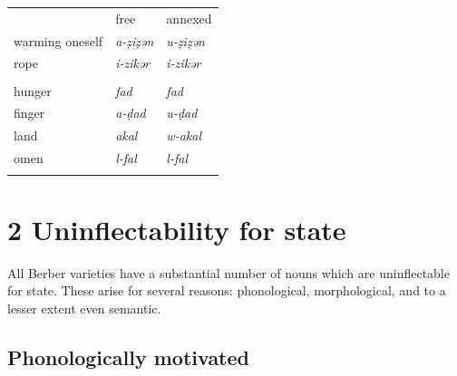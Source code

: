 \documentclass[output=paper]{langscibook}
\begin{document}
\begin{styleLangsciTableHeading}%
\begin{table}
\caption{Examples of allomorphy in state marking in Kabyle (cf. \citealt{Dallet1982})}
\label{tab:key:2}
\end{table}\end{styleLangsciTableHeading}


\begin{tabularx}{\textwidth}{XXX}
 & free & annexed\\
\lsptoprule
warming oneself & \textit{a-ẓiẓən} & \textit{u-ẓiẓən}\\
rope & \textit{i-zikər} & \textit{i-zikər}\\
&  & \\
hunger & \textit{fad} & \textit{fad}\\
finger & \textit{a-ḍad} & \textit{u-ḍad}\\
land & \textit{akal} & \textit{w-akal}\\
omen & \textit{l-fal} & \textit{l-fal}\\
\lspbottomrule
\end{tabularx}
\section{2 Uninflectability for state}
\begin{styleStandarduser}
All Berber varieties have a substantial number of nouns which are uninflectable for state. These arise for several reasons: phonological, morphological, and to a lesser extent even semantic.
\end{styleStandarduser}

\subsection{Phonologically motivated} %
\end{document}
